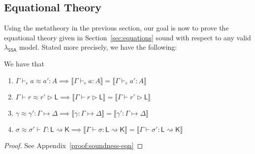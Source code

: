 \documentclass[acmsmall,screen,review]{acmart}
\newcommand{\ms}[1]{\ensuremath{\mathsf{#1}}}
\newcommand{\hasty}[4]{#1 \vdash_{#2} #3: {#4}}
\newcommand{\haslb}[3]{#1 \vdash #2 \rhd #3}
\newcommand{\issubst}[3]{#1: #2 \mapsto #3}
\newcommand{\lbsubst}[4]{#1 \vdash #2: #3 \rightsquigarrow #4}
\newcommand{\teqv}{\approx}
\newcommand{\tmeq}[5]{#1 \vdash_{#2} #3 \teqv #4 : {#5}}
\newcommand{\lbeq}[4]{#1 \vdash #2 \teqv #3 \rhd {#4}}
\newcommand{\tmseq}[4]{\issubst{#1 \teqv #2}{#3}{#4}}
\newcommand{\lbseq}[5]{\lbsubst{#1 \teqv #2}{#3}{#4}{#5}}
\newcommand{\dnt}[1]{\llbracket{#1}\rrbracket}
\newcommand{\isotopessa}{\(\lambda_{\ms{SSA}}\)}
\begin{document}
\subsection{Equational Theory}

\label{ssec:completeness}

Using the metatheory in the previous section, our goal is now to prove the equational theory given
in Section~\ref{sec:equations} sound with respect to any valid \isotopessa{} model. Stated more
precisely, we have the following:
\begin{theorem}[name=Soundness (Equational Theory), restate=soundnesseqn]
  We have that
  \begin{enumerate}[label=(\alph*)]
    \item $\tmeq{\Gamma}{\epsilon}{a}{a'}{A} \implies 
      \dnt{\hasty{\Gamma}{\epsilon}{a}{A}} = \dnt{\hasty{\Gamma}{\epsilon}{a'}{A}}$
      \label{itm:eqn-sound-expr}
    \item $\lbeq{\Gamma}{r}{r'}{\ms{L}} \implies
      \dnt{\haslb{\Gamma}{r}{\ms{L}}} = \dnt{\haslb{\Gamma}{r'}{\ms{L}}}$
      \label{itm:eqn-sound-region}
    \item $\tmseq{\gamma}{\gamma'}{\Gamma}{\Delta} \implies
      \dnt{\issubst{\gamma}{\Gamma}{\Delta}} = \dnt{\issubst{\gamma'}{\Gamma}{\Delta}}$
      \label{itm:eqn-sound-vsubst}
    \item $\lbseq{\sigma}{\sigma'}{\Gamma}{\ms{L}}{\ms{K}} \implies
      \dnt{\lbsubst{\Gamma}{\sigma}{\ms{L}}{\ms{K}}} 
      = \dnt{\lbsubst{\Gamma}{\sigma'}{\ms{L}}{\ms{K}}}$ 
      \label{itm:eqn-sound-lsubst}
  \end{enumerate}
\end{theorem}
\begin{proof}
  See Appendix~\ref{proof:soundness-eqn}
\end{proof}
\end{document}
